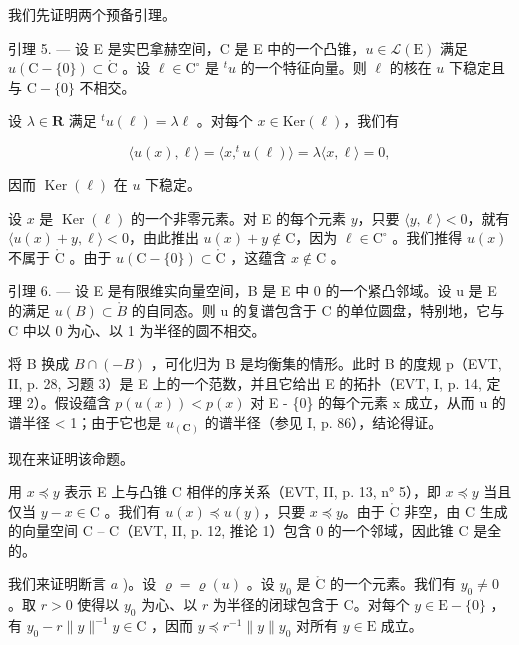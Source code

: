 我们先证明两个预备引理。

引理 5. --- 设 E 是实巴拿赫空间，C 是 E 中的一个凸锥，\(u \in \mathcal{L}(\mathrm{E})\) 满足 \(u(\mathrm{C} - \{0\}) \subset \mathring{\mathrm{C}}\) 。设 \(\ell \in \mathrm{C}^{\circ}\) 是 \(^{t}u\) 的一个特征向量。则 \(\ell\) 的核在 \(u\) 下稳定且与 \(\mathrm{C} - \{0\}\) 不相交。

设 \(\lambda \in \mathbf{R}\) 满足 \(^t u(\ell) = \lambda \ell\) 。对每个 \(x \in \mathrm{Ker}(\ell)\)，我们有

\[
\langle u (x), \ell \rangle = \langle x, ^ {t} u (\ell) \rangle = \lambda \langle x, \ell \rangle = 0,
\]

因而 \(\operatorname{Ker}(\ell)\) 在 \(u\) 下稳定。

设 \(x\) 是 \(\operatorname{Ker}(\ell)\) 的一个非零元素。对 E 的每个元素 \(y\)，只要 \(\langle y, \ell \rangle < 0\)，就有 \(\langle u(x) + y, \ell \rangle < 0\)，由此推出 \(u(x) + y \notin \mathrm{C}\)，因为 \(\ell \in \mathrm{C}^\circ\) 。我们推得 \(u(x)\) 不属于 \(\mathring{\mathrm{C}}\) 。由于 \(u(\mathrm{C} - \{0\}) \subset \mathring{\mathrm{C}}\) ，这蕴含 \(x \notin \mathrm{C}\) 。

引理 6. --- 设 E 是有限维实向量空间，B 是 E 中 0 的一个紧凸邻域。设 u 是 E 的满足 \(u(B) \subset \mathring{B}\) 的自同态。则 u 的复谱包含于 C 的单位圆盘，特别地，它与 C 中以 0 为心、以 1 为半径的圆不相交。

将 B 换成 \(B \cap (-B)\) ，可化归为 B 是均衡集的情形。此时 B 的度规 p（EVT, II, p. 28, 习题 3）是 E 上的一个范数，并且它给出 E 的拓扑（EVT, I, p. 14, 定理 2）。假设蕴含 \(p(u(x)) < p(x)\) 对 E - \{0\} 的每个元素 x 成立，从而 u 的谱半径 \textless{} 1；由于它也是 \(u_{(\mathbf{C})}\) 的谱半径（参见 I, p. 86），结论得证。

现在来证明该命题。

用 \(x \preccurlyeq y\) 表示 E 上与凸锥 C 相伴的序关系（EVT, II, p. 13, n° 5），即 \(x \preccurlyeq y\) 当且仅当 \(y - x \in \mathrm{C}\) 。我们有 \(u(x) \preccurlyeq u(y)\)，只要 \(x \preccurlyeq y\)。由于 \(\mathring{\mathrm{C}}\) 非空，由 C 生成的向量空间 C -- C（EVT, II, p. 12, 推论 1）包含 0 的一个邻域，因此锥 C 是全的。

我们来证明断言 \(a\) )。设 \(\varrho = \varrho(u)\) 。设 \(y_0\) 是 \(\mathring{\mathrm{C}}\) 的一个元素。我们有 \(y_0 \neq 0\) 。取 \(r > 0\) 使得以 \(y_0\) 为心、以 \(r\) 为半径的闭球包含于 C。对每个 \(y \in \mathrm{E} - \{0\}\) ，有 \(y_0 - r \| y\|^{-1}y \in \mathrm{C}\) ，因而 \(y \preccurlyeq r^{-1}\| y\| y_0\) 对所有 \(y \in \mathrm{E}\) 成立。

